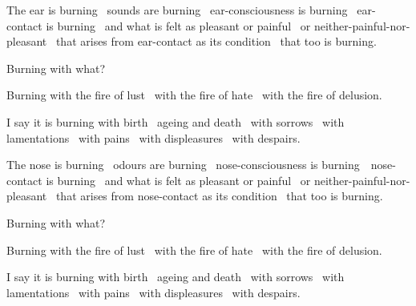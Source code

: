 \begin{english-only-hang}
  The ear is burning \breathmark\ sounds are burning \breathmark\ ear-consciousness is burning \breathmark\ ear-contact is burning \breathmark\ and what is felt as pleasant or painful \breathmark\ or neither-painful-nor-pleasant \breathmark\ that arises from ear-contact as its condition \breathmark\ that too is burning.
\end{english-only-hang}
\begin{english-only-hangtogether}
  Burning with what?
\end{english-only-hangtogether}
\begin{english-only-hangtogether}
  Burning with the fire of lust \breathmark\ with the fire of hate \breathmark\ with the fire of delusion.
\end{english-only-hangtogether}
\begin{english-only-hangtogether}
  I say it is burning with birth \breathmark\ ageing and death \breathmark\ with sorrows \breathmark\ with lamentations \breathmark\ with pains \breathmark\ with displeasures \breathmark\ with despairs.
\end{english-only-hangtogether}

\begin{english-only-hang}
  The nose is burning \breathmark\ odours are burning \breathmark\ nose-consciousness is \mbox{burning}~\breathmark\ nose-contact is burning \breathmark\ and what is felt as pleasant or painful \breathmark\ or neither-painful-nor-pleasant \breathmark\ that arises from nose-contact as its condition \breathmark\ that too is burning.
\end{english-only-hang}
\begin{english-only-hangtogether}
  Burning with what?
\end{english-only-hangtogether}
\begin{english-only-hangtogether}
  Burning with the fire of lust \breathmark\ with the fire of hate \breathmark\ with the fire of delusion.
\end{english-only-hangtogether}
\begin{english-only-hangtogether}
  I say it is burning with birth \breathmark\ ageing and death \breathmark\ with sorrows \breathmark\ with lamentations \breathmark\ with pains \breathmark\ with displeasures \breathmark\ with despairs.
\end{english-only-hangtogether}

